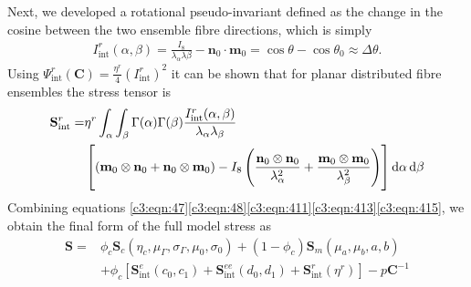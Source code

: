     
    Next, we developed a rotational pseudo-invariant defined as the change in the cosine between the two ensemble fibre directions, which is simply
        \begin{equation}\label{c3:eqn:414}
        \begin{aligned}
        I_\mathrm{int}^r(\alpha,\beta) = \frac{I_8}{\lambda_\alpha\lambda\beta} - \mathbf{n}_0\cdot\mathbf{m}_0 = \cos{\theta}-\cos{\theta_0}\approx \Delta\theta.
        \end{aligned}
        \end{equation}
    Using $\Psi_\mathrm{int}^r(\mathbf{C}) = \frac{\eta^r}{4}(I_\mathrm{int}^r)^2$ it can be shown that for planar distributed fibre ensembles the stress tensor is
        \begin{equation}\label{c3:eqn:415}
        \begin{aligned}
        \mathbf{S}_\mathrm{int}^r =& \eta^r \int_\alpha\int_\beta \Gamma(\alpha)\Gamma(\beta) \frac{I_\mathrm{int}^r(\alpha,\beta)}{\lambda_\alpha\lambda_\beta}  \\
        &\left[\left(\mathbf{m}_0\otimes\mathbf{n}_0 + \mathbf{n}_0\otimes\mathbf{m}_0\right)
        - I_8
        \left(\frac{\mathbf{n}_0\otimes\mathbf{n}_0}{\lambda_\alpha^2} + \frac{\mathbf{m}_0\otimes\mathbf{m}_0}{\lambda_\beta^2}\right)\right]\dif\alpha\dif\beta
        \end{aligned}
        \end{equation}
    Combining equations \ref{c3:eqn:47}\ref{c3:eqn:48}\ref{c3:eqn:411}\ref{c3:eqn:413}\ref{c3:eqn:415}, we obtain the final form of the full model stress as
        \begin{equation}\label{c3:eqn:416}
        \begin{aligned}
        \mathbf{S} =& \phi_c\mathbf{S}_c(\eta_c, \mu_\Gamma, \sigma_\Gamma, \mu_0, \sigma_0) + (1-\phi_c)\mathbf{S}_m(\mu_a, \mu_b, a, b) \\
        &+ \phi_c[\mathbf{S}_\mathrm{int}^e(c_0,c_1) + \mathbf{S}_\mathrm{int}^{ee}(d_0,d_1) + \mathbf{S}_\mathrm{int}^r(\eta^r)] - p\mathbf{C}^{-1}
        \end{aligned}
        \end{equation}
    
        
        
        